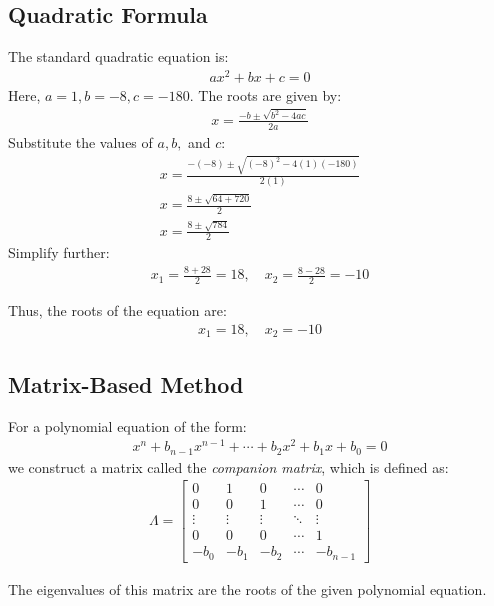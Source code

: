 \documentclass[journal]{IEEEtran}
\begin{document}
\subsection*{Quadratic Formula}
The standard quadratic equation is:
\begin{align}
    ax^2 + bx + c = 0
\end{align}
Here, \( a = 1, b = -8, c = -180 \). The roots are given by:
\begin{align}
    x = \frac{-b \pm \sqrt{b^2 - 4ac}}{2a}
\end{align}
Substitute the values of \( a, b, \) and \( c \):
\begin{align}
    x = \frac{-(-8) \pm \sqrt{(-8)^2 - 4(1)(-180)}}{2(1)} \\
    x = \frac{8 \pm \sqrt{64 + 720}}{2} \\
    x = \frac{8 \pm \sqrt{784}}{2}
\end{align}
Simplify further:
\begin{align}
    x_1 = \frac{8 + 28}{2} = 18, \quad x_2 = \frac{8 - 28}{2} = -10
\end{align}

Thus, the roots of the equation are:
\begin{align}
    x_1 = 18, \quad x_2 = -10
\end{align}

\subsection*{Matrix-Based Method}
For a polynomial equation of the form:
\begin{align}
    x^n + b_{n-1}x^{n-1} + \cdots + b_2x^2 + b_1x + b_0 = 0
\end{align}
we construct a matrix called the \textit{companion matrix}, which is defined as:
\begin{align}
    \Lambda =
    \begin{bmatrix}
        0 & 1 & 0 & \cdots & 0 \\
        0 & 0 & 1 & \cdots & 0 \\
        \vdots & \vdots & \vdots & \ddots & \vdots \\
        0 & 0 & 0 & \cdots & 1 \\
        -b_0 & -b_1 & -b_2 & \cdots & -b_{n-1}
    \end{bmatrix}
\end{align}

The eigenvalues of this matrix are the roots of the given polynomial equation.
\end{document}
